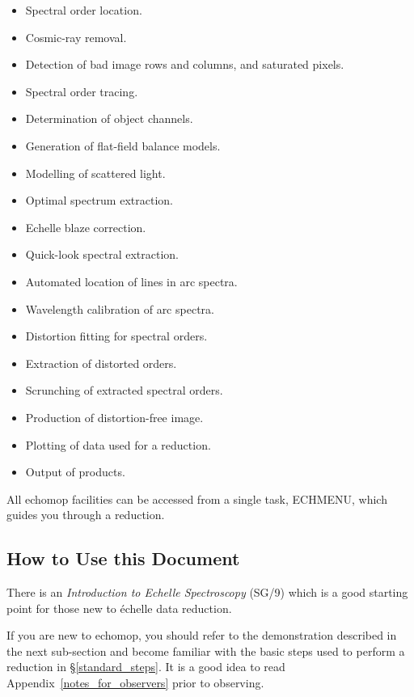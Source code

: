 \documentclass[twoside,11pt]{article}
\newcommand{\htmlref}[2]{#1}
\newcommand{\xref}[3]{#1}
\renewcommand{\_}{\texttt{\symbol{95}}}
\newcommand{\sunspec}[2]{#1}
\newcommand{\sunspec}[2]{#2}
\begin{document}
\begin{itemize}

\item Spectral order location.
\item Cosmic-ray removal.
\item Detection of bad image rows and columns, and saturated pixels.
\item Spectral order tracing.
\item Determination of object channels.
\item Generation of flat-field balance models.
\item Modelling of scattered light.
\item Optimal spectrum extraction.
\item Echelle blaze correction.
\item Quick-look spectral extraction.
\item Automated location of lines in arc spectra.
\item Wavelength calibration of arc spectra.
\item Distortion fitting for spectral orders.
\item Extraction of distorted orders.
\item Scrunching of extracted spectral orders.
\item Production of distortion-free image.
\item Plotting of data used for a reduction.
\item Output of products.

\end{itemize}

All {\sc echomop} facilities can be accessed from a single task, ECHMENU,
which guides you through a reduction.


\subsection{ How to Use this Document}

There is an \xref{{\sl Introduction to Echelle Spectroscopy} (SG/9)}{sg9}{}
which is a good starting point for those new to \'{e}chelle data reduction.

If you are new to {\sc echomop}, you should refer to the demonstration
described in the next sub-section and become familiar with the basic
steps used to perform a reduction in
\sunspec{\S\ref{standard_steps}}{\htmlref{Standard
Steps}{standard_steps}}\@.
It is a good idea to read
\sunspec{Appendix~\ref{notes_for_observers}}{the \htmlref{Notes for
Observers}{notes_for_observers}} prior to observing.
\end{document}

